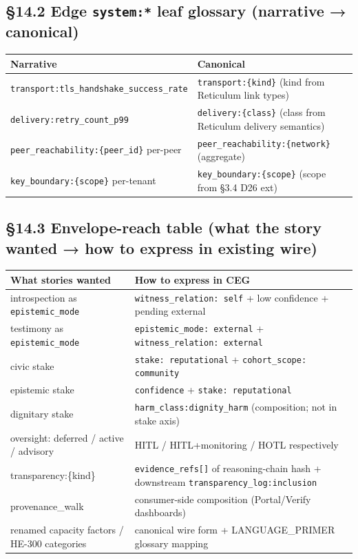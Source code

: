 \documentclass[11pt]{article}
\begin{document}
\subsection*{§14.2 Edge \texttt{system:*} leaf glossary (narrative → canonical)}


{\footnotesize
\begin{longtable}{|p{8.0cm}|p{8.0cm}|}\hline
\textbf{Narrative} & \textbf{Canonical} \\ \hline\endhead
\texttt{transport:tls\_handshake\_success\_rate} & \texttt{transport:\{kind\}} (kind from Reticulum link types) \\ \hline
\texttt{delivery:retry\_count\_p99} & \texttt{delivery:\{class\}} (class from Reticulum delivery semantics) \\ \hline
\texttt{peer\_reachability:\{peer\_id\}} per-peer & \texttt{peer\_reachability:\{network\}} (aggregate) \\ \hline
\texttt{key\_boundary:\{scope\}} per-tenant & \texttt{key\_boundary:\{scope\}} (scope from §3.4 D26 ext) \\ \hline
\end{longtable}}


\subsection*{§14.3 Envelope-reach table (what the story wanted → how to express in existing wire)}


{\footnotesize
\begin{longtable}{|p{8.0cm}|p{8.0cm}|}\hline
\textbf{What stories wanted} & \textbf{How to express in CEG} \\ \hline\endhead
introspection as \texttt{epistemic\_mode} & \texttt{witness\_relation: self} + low confidence + pending external \\ \hline
testimony as \texttt{epistemic\_mode} & \texttt{epistemic\_mode: external} + \texttt{witness\_relation: external} \\ \hline
civic stake & \texttt{stake: reputational} + \texttt{cohort\_scope: community} \\ \hline
epistemic stake & \texttt{confidence} + \texttt{stake: reputational} \\ \hline
dignitary stake & \texttt{harm\_class:dignity\_harm} (composition; not in stake axis) \\ \hline
oversight: deferred / active / advisory & HITL / HITL+monitoring / HOTL respectively \\ \hline
transparency:\{kind\} & \texttt{evidence\_refs[]} of reasoning-chain hash + downstream \texttt{transparency\_log:inclusion} \\ \hline
provenance\_walk & consumer-side composition (Portal/Verify dashboards) \\ \hline
renamed capacity factors / HE-300 categories & canonical wire form + LANGUAGE\_PRIMER glossary mapping \\ \hline
\end{longtable}}
\end{document}
